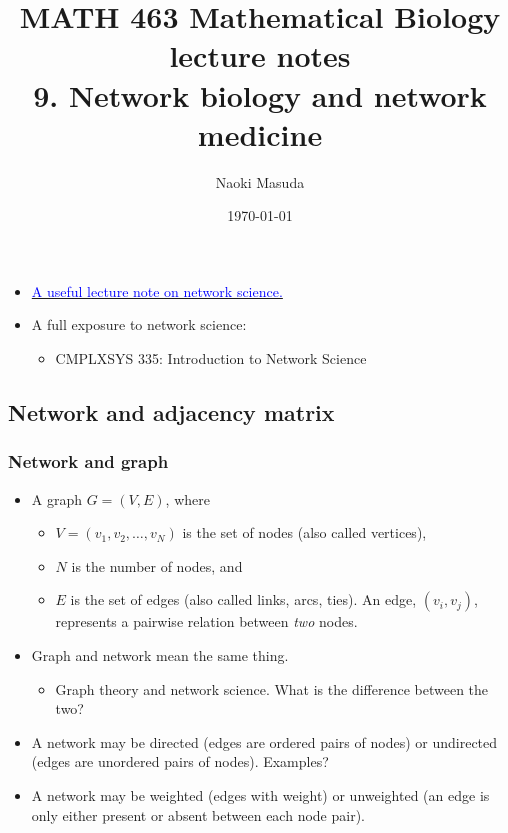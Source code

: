 \documentclass[20pt]{extarticle}
\newcommand{\hrefc}[2]{\href{#1}{\textcolor{blue}{#2}}}
\begin{document}
\title{MATH 463 Mathematical Biology\\ lecture notes\\
9. Network biology and network medicine}
\date{\today}
\author{Naoki Masuda}

\maketitle

\begin{itemize}
\item \hrefc{https://network-science-notes.github.io/}{A useful lecture note on network science.}
\item A full exposure to network science:
	\begin{itemize}
	\item CMPLXSYS 335: Introduction to Network Science
	\end{itemize}
\end{itemize}

\subsection*{Network and adjacency matrix}

\subsubsection*{Network and graph}

\begin{itemize}
\item A graph $G = (V, E)$, where
	\begin{itemize}
	\item $V = (v_1, v_2, \ldots, v_N)$ is the set of nodes (also called vertices),
	\item $N$ is the number of nodes, and
	\item $E$ is the set of edges (also called links, arcs, ties). An edge, $(v_i, v_j)$, represents a pairwise relation between \emph{two} nodes.
	\end{itemize}
\item Graph and network mean the same thing.
	\begin{itemize}
	\item Graph theory and network science. What is the difference between the two?
	\end{itemize}
\item A network may be directed (edges are ordered pairs of nodes) or undirected (edges are unordered pairs of nodes). Examples?
\item A network may be weighted (edges with weight) or unweighted (an edge is only either present or absent between each node pair).
\end{itemize}
\end{document}
